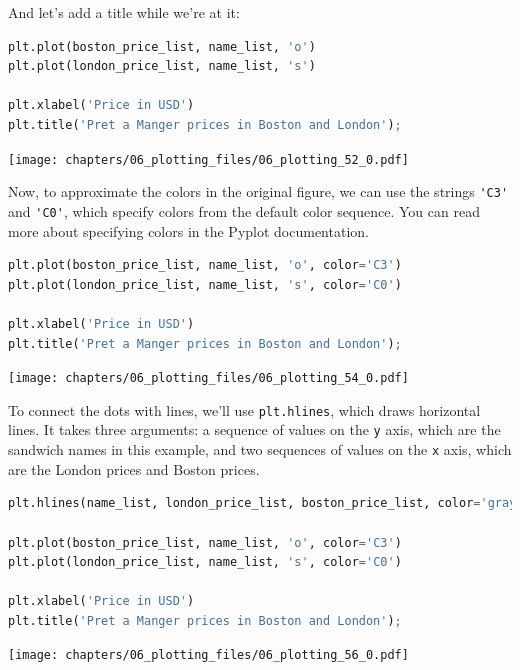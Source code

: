 And let's add a title while we're at it:

\begin{lstlisting}[language=Python,style=source]
plt.plot(boston_price_list, name_list, 'o')
plt.plot(london_price_list, name_list, 's')

plt.xlabel('Price in USD')
plt.title('Pret a Manger prices in Boston and London');
\end{lstlisting}

\begin{center}
\texttt{[image: chapters/06\_plotting\_files/06\_plotting\_52\_0.pdf]}
\end{center}

Now, to approximate the colors in the original figure, we can use the
strings \passthrough{\lstinline!'C3'!} and
\passthrough{\lstinline!'C0'!}, which specify colors from the default
color sequence. You can read more about specifying colors in the Pyplot
documentation.

\begin{lstlisting}[language=Python,style=source]
plt.plot(boston_price_list, name_list, 'o', color='C3')
plt.plot(london_price_list, name_list, 's', color='C0')

plt.xlabel('Price in USD')
plt.title('Pret a Manger prices in Boston and London');
\end{lstlisting}

\begin{center}
\texttt{[image: chapters/06\_plotting\_files/06\_plotting\_54\_0.pdf]}
\end{center}

To connect the dots with lines, we'll use
\passthrough{\lstinline!plt.hlines!}, which draws horizontal lines. It
takes three arguments: a sequence of values on the
\passthrough{\lstinline!y!} axis, which are the sandwich names in this
example, and two sequences of values on the \passthrough{\lstinline!x!}
axis, which are the London prices and Boston prices.

\begin{lstlisting}[language=Python,style=source]
plt.hlines(name_list, london_price_list, boston_price_list, color='gray')

plt.plot(boston_price_list, name_list, 'o', color='C3')
plt.plot(london_price_list, name_list, 's', color='C0')

plt.xlabel('Price in USD')
plt.title('Pret a Manger prices in Boston and London');
\end{lstlisting}

\begin{center}
\texttt{[image: chapters/06\_plotting\_files/06\_plotting\_56\_0.pdf]}
\end{center}

